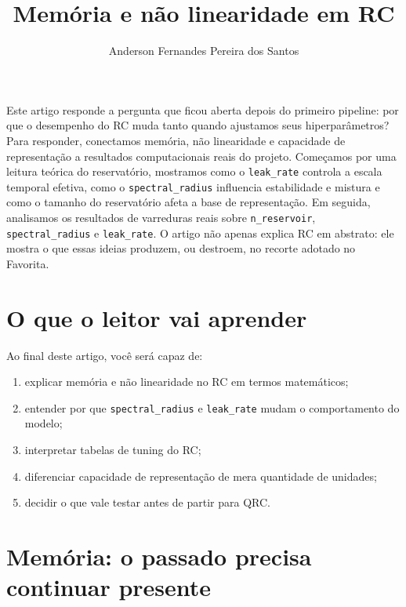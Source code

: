 \documentclass[12pt]{article}
\title{Memória e não linearidade em RC}
\author{Anderson Fernandes Pereira dos Santos}
\providecommand{\tightlist}{%
              \setlength{\itemsep}{0pt}\setlength{\parskip}{0pt}}
\begin{document}
            \maketitle

            \begin{resumo}
            Este artigo responde a pergunta que ficou aberta depois do primeiro pipeline: por que o desempenho do RC muda tanto quando ajustamos seus hiperparâmetros? Para responder, conectamos memória, não linearidade e capacidade de representação a resultados computacionais reais do projeto. Começamos por uma leitura teórica do reservatório, mostramos como o \texttt{leak\_rate} controla a escala temporal efetiva, como o \texttt{spectral\_radius} influencia estabilidade e mistura e como o tamanho do reservatório afeta a base de representação. Em seguida, analisamos os resultados de varreduras reais sobre \texttt{n\_reservoir}, \texttt{spectral\_radius} e \texttt{leak\_rate}. O artigo não apenas explica RC em abstrato: ele mostra o que essas ideias produzem, ou destroem, no recorte adotado no Favorita.
            \end{resumo}

            \section{O que o leitor vai aprender}\label{1-o-que-o-leitor-vai-aprender}

Ao final deste artigo, você será capaz de:

\begin{enumerate}
\def\labelenumi{\arabic{enumi}.}
\tightlist
\item
  explicar memória e não linearidade no RC em termos matemáticos;
\item
  entender por que \texttt{spectral\_radius} e \texttt{leak\_rate} mudam o comportamento do modelo;
\item
  interpretar tabelas de tuning do RC;
\item
  diferenciar capacidade de representação de mera quantidade de unidades;
\item
  decidir o que vale testar antes de partir para QRC.
\end{enumerate}

\section{Memória: o passado precisa continuar presente}\label{2-memuxf3ria-o-passado-precisa-continuar-presente}
\end{document}
